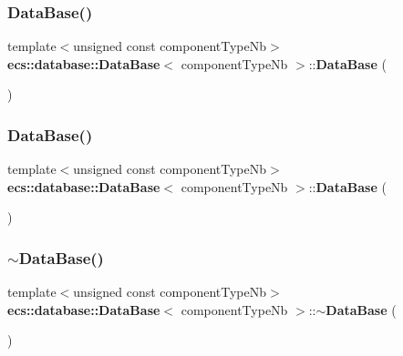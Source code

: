 \subsubsection{Data\+Base()\hspace{0.1cm}{\footnotesize\ttfamily [1/2]}}
{\footnotesize\ttfamily template$<$unsigned const component\+Type\+Nb$>$ \\
{\bf ecs\+::database\+::\+Data\+Base}$<$ component\+Type\+Nb $>$\+::{\bf Data\+Base} (\begin{DoxyParamCaption}\item[{void}]{ }\end{DoxyParamCaption})}

\label{classecs_1_1database_1_1_data_base_a579413631c10476c036097b5eadb9721} 
\subsubsection{Data\+Base()\hspace{0.1cm}{\footnotesize\ttfamily [2/2]}}
{\footnotesize\ttfamily template$<$unsigned const component\+Type\+Nb$>$ \\
{\bf ecs\+::database\+::\+Data\+Base}$<$ component\+Type\+Nb $>$\+::{\bf Data\+Base} (\begin{DoxyParamCaption}\item[{{\bf Data\+Base}$<$ component\+Type\+Nb $>$ const \&}]{ }\end{DoxyParamCaption})\hspace{0.3cm}{\ttfamily [delete]}}

\label{classecs_1_1database_1_1_data_base_a8aa55d2b55636d8069802298d57755a1} 
\subsubsection{$\sim$\+Data\+Base()}
{\footnotesize\ttfamily template$<$unsigned const component\+Type\+Nb$>$ \\
{\bf ecs\+::database\+::\+Data\+Base}$<$ component\+Type\+Nb $>$\+::$\sim${\bf Data\+Base} (\begin{DoxyParamCaption}\item[{void}]{ }\end{DoxyParamCaption})}



